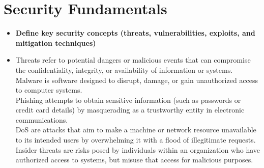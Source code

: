 \documentclass{article}
\begin{document}
\section{Security Fundamentals}
\begin{itemize}
  \item \textbf{Define key security concepts (threats, vulnerabilities, exploits, and mitigation techniques)}
  	\item[] Threats refer to potential dangers or malicious events that can compromise the confidentiality, integrity, or availability of information or systems.\\
	Malware is software designed to disrupt, damage, or gain unauthorized access to computer systems.\\
	Phishing attempts to obtain sensitive information (such as passwords or credit card details) by masquerading as a trustworthy entity in electronic communications.\\
	DoS are attacks that aim to make a machine or network resource unavailable to its intended users by overwhelming it with a flood of illegitimate requests.\\
	Insider threats are risks posed by individuals within an organization who have authorized access to systems, but misuse that access for malicious purposes.\\

\end{itemize}
\end{document}
